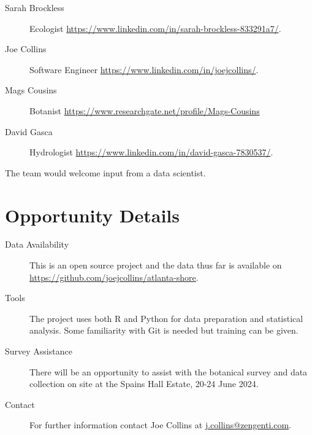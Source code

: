 \documentclass[12pt]{article}
\begin{document}
\begin{description}
    \item[Sarah Brockless] Ecologist \href{https://www.linkedin.com/in/sarah-brockless-833291a7/}{https://www.linkedin.com/in/sarah-brockless-833291a7/}.
    \item[Joe Collins] Software Engineer \href{https://www.linkedin.com/in/joejcollins/}{https://www.linkedin.com/in/joejcollins/}.
    \item[Mags Cousins] Botanist \href{https://www.researchgate.net/profile/Mags-Cousins}{https://www.researchgate.net/profile/Mags-Cousins}
    \item[David Gasca] Hydrologist \href{https://www.linkedin.com/in/david-gasca-7830537/}{https://www.linkedin.com/in/david-gasca-7830537/}.
\end{description}

The team would welcome input from a data scientist.

\section*{Opportunity Details}

\begin{description}
    \item[Data Availability] This is an open source project and
        the data thus far is available on \href{https://github.com/joejcollins/atlanta-shore}{https://github.com/joejcollins/atlanta-shore}.
    \item[Tools] The project uses both R and Python for data preparation and statistical analysis.
        Some familiarity with Git is needed but training can be given.
    \item[Survey Assistance] There will be an opportunity to assist with the botanical survey
        and data collection on site at the Spains Hall Estate, 20-24 June 2024.
    \item[Contact] For further information contact Joe Collins at \href{mailto:j.collins@zengenti.com}{j.collins@zengenti.com}.
\end{description}
\end{document}
